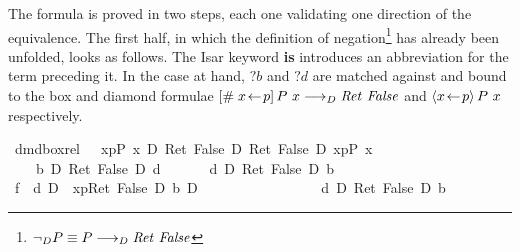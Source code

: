 The formula is proved in two steps, each one validating one direction of the
equivalence. The first half, in which the definition of negation\footnote{$\lnot_D P
  \equiv P \longrightarrow_D \mathit{Ret}~\mathit{False}$} has already been unfolded, looks as follows. The
Isar keyword \textbf{is} introduces an abbreviation for the term preceding it.
In the case at hand, $?b$ and $?d$ are matched against and bound to the box and
diamond formulae $[\#\;x\!\gets\! p]\,{P\ x \longrightarrow_D \mathit{Ret}~\mathit{False}}$ and
$\langle x\!\gets\! p\rangle\,{P\ x}$ respectively.
\begin{isabellebody}
\isanewline
{}\ dmd{\isacharunderscore}box{\isacharunderscore}rel{}{\isacharcolon}\ {\isachardoublequote}{\isasymturnstile}\ {\isacharparenleft}{\isacharbrackleft}{\isacharhash}\ x{\isasymleftarrow}p{\isacharbrackright}{\isacharparenleft}P\ x\ {\isasymlongrightarrow}\isactrlsub D\ Ret\ False{\isacharparenright}\ {\isasymlongrightarrow}\isactrlsub D\ Ret\ False{\isacharparenright}\ {\isasymlongrightarrow}\isactrlsub D\ {\isasymlangle}x{\isasymleftarrow}p{\isasymrangle}{\isacharparenleft}P\ x{\isacharparenright}{\isachardoublequote}\ \isanewline
\ \ {\isacharparenleft}\ {\isachardoublequote}{\isasymturnstile}\ {\isacharparenleft}{\isacharquery}b\ {\isasymlongrightarrow}\isactrlsub D\ Ret\ False{\isacharparenright}\ {\isasymlongrightarrow}\isactrlsub D\ {\isacharquery}d{\isachardoublequote}{\isacharparenright}\isanewline
\isamarkupfalse%
\ {\isacharminus}\isanewline
\ \ \isamarkupfalse%
\ {\isachardoublequote}{\isasymturnstile}\ {\isacharparenleft}{\isacharquery}d\ {\isasymlongrightarrow}\isactrlsub D\ Ret\ False{\isacharparenright}\ {\isasymlongrightarrow}\isactrlsub D\ {\isacharquery}b{\isachardoublequote}\ \isanewline
\ \ \isamarkupfalse%
\ {\isacharminus}\isanewline
\ \ \ \ \isamarkupfalse%
\ f{}{\isacharcolon}\ {\isachardoublequote}{\isasymturnstile}\ {\isacharparenleft}{\isacharparenleft}{\isacharquery}d\ {\isasymlongrightarrow}\isactrlsub D\ {\isacharbrackleft}{\isacharhash}\ x{\isasymleftarrow}p{\isacharbrackright}{\isacharparenleft}Ret\ False{\isacharparenright}{\isacharparenright}\ {\isasymlongrightarrow}\isactrlsub D\ {\isacharquery}b{\isacharparenright}\ {\isasymlongrightarrow}\isactrlsub D\ \isanewline
\ \ \ \ \ \ \ \ \ \ \ \ \ \ \ \ {\isacharparenleft}{\isacharquery}d\ {\isasymlongrightarrow}\isactrlsub D\ Ret\ False{\isacharparenright}\ {\isasymlongrightarrow}\isactrlsub D\ {\isacharquery}b{\isachardoublequote}\isanewline
\ \ \ \ \ \ \isamarkupfalse%

\end{isabellebody}
